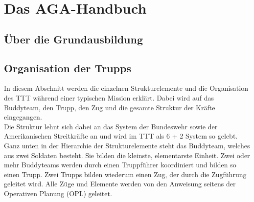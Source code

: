\section{Das AGA-Handbuch}
\subsection{Über die Grundausbildung}
\subsection{Organisation der Trupps}
In diesem Abschnitt werden die einzelnen Strukturelemente und die Organisation des \ac{TTT} während einer typischen Mission erklärt. Dabei wird auf das Buddyteam, den Trupp, den Zug und die gesamte Struktur der Kräfte eingegangen.\\
Die Struktur lehnt sich dabei an das System der Bundeswehr sowie der Amerikanischen Streitkräfte an und wird im \ac{TTT} als 6 + 2 System so gelebt.\\
Ganz unten in der Hierarchie der Strukturelemente steht das Buddyteam, welches aus zwei Soldaten besteht. Sie bilden die kleinste, elementarste Einheit. Zwei oder mehr Buddyteams werden durch einen Truppführer koordiniert und bilden so einen Trupp. Zwei Trupps bilden wiederum einen Zug, der durch die Zugführung geleitet wird. Alle Züge und Elemente werden von den Anweisung seitens der Operativen Planung (\ac{OPL}) geleitet.  
